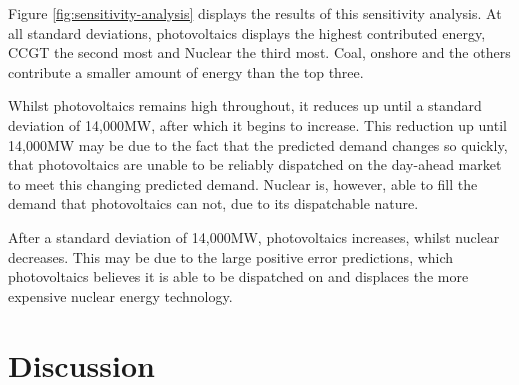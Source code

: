 \documentclass[final,3p,times,twocolumn,numbers]{elsarticle}
\begin{document}
Figure \ref{fig:sensitivity-analysis} displays the results of this sensitivity analysis. At all standard deviations, photovoltaics displays the highest contributed energy, CCGT the second most and Nuclear the third most. Coal, onshore and the others contribute a smaller amount of energy than the top three.

Whilst photovoltaics remains high throughout, it reduces up until a standard deviation of 14,000MW, after which it begins to increase. This reduction up until 14,000MW may be due to the fact that the predicted demand changes so quickly, that photovoltaics are unable to be reliably dispatched on the day-ahead market to meet this changing predicted demand. Nuclear is, however, able to fill the demand that photovoltaics can not, due to its dispatchable nature.

After a standard deviation of 14,000MW, photovoltaics increases, whilst nuclear decreases. This may be due to the large positive error predictions, which photovoltaics believes it is able to be dispatched on and displaces the more expensive nuclear energy technology.











\section{Discussion}
\label{sec:discussion}
\end{document}
